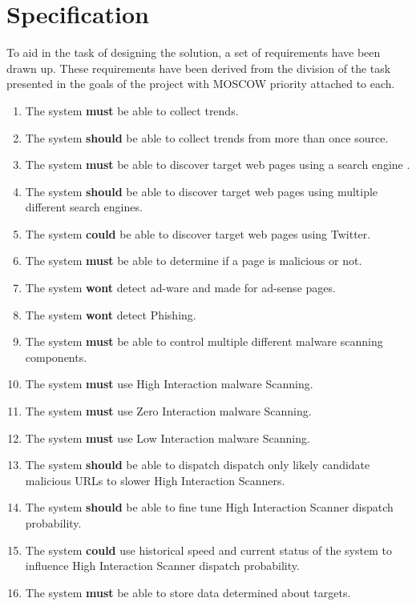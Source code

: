 \section{Specification} To aid in the task of designing the solution, a set of
requirements have been drawn up. These requirements have been derived from the
division of the task presented in the goals of the project with MOSCOW priority
attached to each.

\begin{enumerate} \setlength{\itemsep}{1pt}
    \item The system \textbf{must} be able to collect trends.
    \item The system \textbf{should} be able to collect trends from more than once source.
    \item The system \textbf{must} be able to discover target web pages using a search engine .
    \item The system \textbf{should} be able to discover target web pages using multiple different search engines.
    \item The system \textbf{could} be able to discover target web pages using Twitter.
    \item The system \textbf{must} be able to determine if a page is malicious or not.
    \item The system \textbf{wont} detect ad-ware and made for ad-sense pages.
    \item The system \textbf{wont} detect Phishing.
    \item The system \textbf{must} be able to control multiple different malware scanning components.
    \item The system \textbf{must} use High Interaction malware Scanning.
    \item The system \textbf{must} use Zero Interaction malware Scanning.
    \item The system \textbf{must} use Low Interaction malware Scanning.
    \item The system \textbf{should} be able to dispatch dispatch only likely candidate malicious URLs to slower High Interaction Scanners.
    \item The system \textbf{should} be able to fine tune High Interaction Scanner dispatch probability.
    \item The system \textbf{could} use historical speed and current status of the system to influence High Interaction Scanner dispatch probability.
    \item The system \textbf{must} be able to store data determined about targets.

\end{enumerate}

